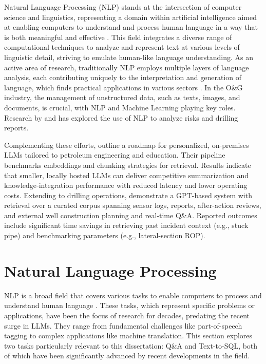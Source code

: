         Natural Language Processing (NLP) stands at the intersection of computer science and linguistics, representing a domain within artificial intelligence aimed at enabling computers to understand and process human language in a way that is both meaningful and effective \citep{Liddy2001}. 
        This field integrates a diverse range of computational techniques to analyze and represent text at various levels of linguistic detail, striving to emulate human-like language understanding. 
        As an active area of research, traditionally NLP employs multiple layers of language analysis, each contributing uniquely to the interpretation and generation of language, which finds practical applications in various sectors \citep{Liddy2001}.      
        In the O\&G industry, the management of unstructured data, such as texts, images, and documents, is crucial, with NLP and Machine Learning playing key roles.
        Research by \citet{Antoniak2016} and \citet{Castineira2018} has explored the use of NLP to analyze risks and drilling reports.           
        
        Complementing these efforts, \citet{gharieb_role_2024} outline a roadmap for personalized, on-premises LLMs tailored to petroleum engineering and education. Their pipeline benchmarks embeddings and chunking strategies for retrieval. Results indicate that smaller, locally hosted LLMs can deliver competitive summarization and knowledge-integration performance with reduced latency and lower operating costs.
        Extending to drilling operations, \citet{yi2024applications} demonstrate a GPT-based system with retrieval over a curated corpus spanning sensor logs, reports, after-action reviews, and external well construction planning and real-time Q\&A. Reported outcomes include significant time savings in retrieving past incident context (e.g., stuck pipe) and benchmarking parameters (e.g., lateral-section ROP).

    \section{Natural Language Processing} \label{sec:nlp-review}

        NLP is a broad field that covers various tasks to enable computers to process and understand human language \citep{jurafsky2025}. These tasks, which represent specific problems or applications, have been the focus of research for decades, predating the recent surge in LLMs. They range from fundamental challenges like part-of-speech tagging to complex applications like machine translation. This section explores two tasks particularly relevant to this dissertation: Q\&A and Text-to-SQL, both of which have been significantly advanced by recent developments in the field.

